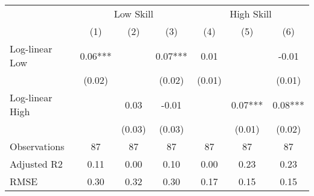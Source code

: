 {
\def\sym#1{\ifmmode^{#1}\else\(^{#1}\)\fi}
\begin{tabular}{l*{6}{c}}
\toprule
            &\multicolumn{3}{c}{Low Skill}                  &\multicolumn{3}{c}{High Skill}                 \\\cmidrule(lr){2-4}\cmidrule(lr){5-7}
            &\multicolumn{1}{c}{(1)}   &\multicolumn{1}{c}{(2)}   &\multicolumn{1}{c}{(3)}   &\multicolumn{1}{c}{(4)}   &\multicolumn{1}{c}{(5)}   &\multicolumn{1}{c}{(6)}   \\
\addlinespace\addlinespace
Log-linear  Low&        0.06***&               &        0.07***&        0.01   &               &       -0.01   \\
            &      (0.02)   &               &      (0.02)   &      (0.01)   &               &      (0.01)   \\
\addlinespace
Log-linear  High&               &        0.03   &       -0.01   &               &        0.07***&        0.08***\\
            &               &      (0.03)   &      (0.03)   &               &      (0.01)   &      (0.02)   \\
\addlinespace\addlinespace
Observations&          87   &          87   &          87   &          87   &          87   &          87   \\
Adjusted R2 &        0.11   &        0.00   &        0.10   &        0.00   &        0.23   &        0.23   \\
RMSE        &        0.30   &        0.32   &        0.30   &        0.17   &        0.15   &        0.15   \\
\bottomrule
\end{tabular}
}
